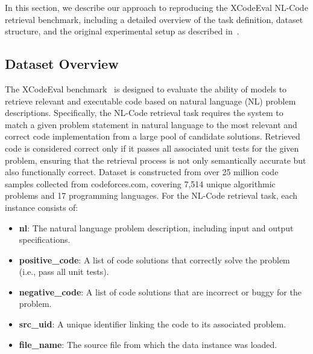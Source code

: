 \documentclass[12pt]{article}
\begin{document}





In this section, we describe our approach to reproducing the XCodeEval NL-Code retrieval benchmark, including a detailed overview of the task definition, dataset structure, and the original experimental setup as described in~\cite{Khan2023}.

\subsection{Dataset Overview}

The XCodeEval benchmark~\cite{Khan2023} is designed to evaluate the ability of models to retrieve relevant and executable code based on natural language (NL) problem descriptions. Specifically, the NL-Code retrieval task requires the system to match a given problem statement in natural language to the most relevant and correct code implementation from a large pool of candidate solutions. Retrieved code is considered correct only if it passes all associated unit tests for the given problem, ensuring that the retrieval process is not only semantically accurate but also functionally correct. Dataset is constructed from over 25 million code samples collected from codeforces.com, covering 7,514 unique algorithmic problems and 17 programming languages. For the NL-Code retrieval task, each instance consists of:
\begin{itemize}
    \item \textbf{nl}: The natural language problem description, including input and output specifications.
    \item \textbf{positive\_code}: A list of code solutions that correctly solve the problem (i.e., pass all unit tests).
    \item \textbf{negative\_code}: A list of code solutions that are incorrect or buggy for the problem.
    \item \textbf{src\_uid}: A unique identifier linking the code to its associated problem.
    \item \textbf{file\_name}: The source file from which the data instance was loaded.
\end{itemize}
\end{document}

